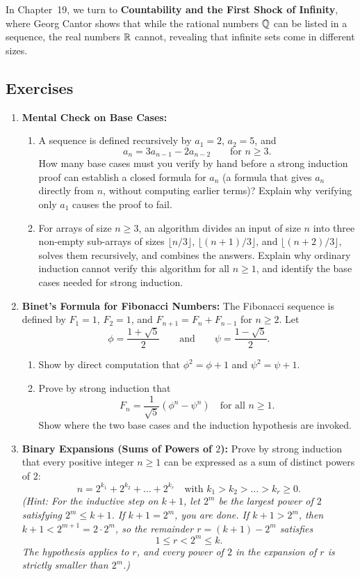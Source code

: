 In Chapter~19, we turn to \textbf{Countability and the First Shock of Infinity}, where Georg Cantor shows that while the rational numbers $\mathbb{Q}$ can be listed in a sequence, the real numbers $\mathbb{R}$ cannot, revealing that infinite sets come in different sizes.

\subsection{Exercises}

\begin{enumerate}
\item \textbf{Mental Check on Base Cases:} 
\begin{enumerate}[label=(\alph*)]
\item A sequence is defined recursively by $a_1 = 2$, $a_2 = 5$, and
\[
a_n = 3a_{n-1} - 2a_{n-2} \qquad \text{for } n \ge 3.
\] How many base cases must you verify by hand before a strong induction proof can establish a closed formula for $a_n$ (a formula that gives $a_n$ directly from $n$, without computing earlier terms)? Explain why verifying only $a_1$ causes the proof to fail.
\item For arrays of size $n \ge 3$, an algorithm divides an input of size $n$ into three non-empty sub-arrays of sizes $\lfloor n/3 \rfloor$, $\lfloor (n+1)/3 \rfloor$, and $\lfloor (n+2)/3 \rfloor$, solves them recursively, and combines the answers. Explain why ordinary induction cannot verify this algorithm for all $n \ge 1$, and identify the base cases needed for strong induction.
\end{enumerate}

\item \textbf{Binet's Formula for Fibonacci Numbers:} 
The Fibonacci sequence is defined by $F_1 = 1$, $F_2 = 1$, and $F_{n+1} = F_n + F_{n-1}$ for $n \ge 2$.
Let
\[
\phi = \frac{1 + \sqrt{5}}{2} \qquad \text{and} \qquad \psi = \frac{1 - \sqrt{5}}{2}.
\]
\begin{enumerate}[label=(\alph*)]
\item Show by direct computation that $\phi^2 = \phi + 1$ and $\psi^2 = \psi + 1$.
\item Prove by strong induction that
\[
F_n = \frac{1}{\sqrt{5}}\left(\phi^n - \psi^n\right) \quad \text{for all } n \ge 1.
\]
Show where the two base cases and the induction hypothesis are invoked.
\end{enumerate}

\item \textbf{Binary Expansions (Sums of Powers of $2$):} 
Prove by strong induction that every positive integer $n \ge 1$ can be expressed as a sum of distinct powers of $2$:
\[
n = 2^{k_1} + 2^{k_2} + \dots + 2^{k_r} \quad \text{with } k_1 > k_2 > \dots > k_r \ge 0.
\]
\emph{(Hint: For the inductive step on $k+1$, let $2^m$ be the largest power of $2$ satisfying $2^m \le k+1$. If $k+1 = 2^m$, you are done. If $k+1 > 2^m$, then $k+1 < 2^{m+1} = 2 \cdot 2^m$, so the remainder $r = (k+1) - 2^m$ satisfies}
\[
1 \le r < 2^m \le k.
\]
\emph{The hypothesis applies to $r$, and every power of $2$ in the expansion of $r$ is strictly smaller than $2^m$.)}


\end{enumerate}
